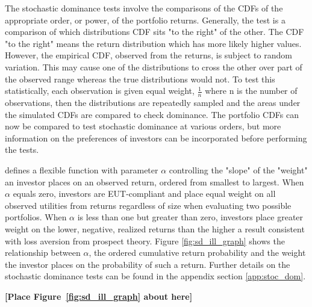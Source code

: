 %		
%	
%		
%	
%		
%	
%		
The stochastic dominance tests involve the comparisons of the CDFs of the appropriate order, or power, of the portfolio returns. Generally, the test is a comparison of which distributions CDF sits "to the right" of the other. The CDF "to the right" means the return distribution which has more likely higher values. However, the empirical CDF, observed from the returns, is subject to random variation. This may cause one of the distributions to cross the other over part of the observed range whereas the true distributions would not. To test this statistically, each observation is given equal weight, $\frac{1}{n}$ where n is the number of observations, then the distributions are repeatedly sampled and the areas under the simulated CDFs are compared to check dominance. The portfolio CDFs can now be compared to test stochastic dominance at various orders, but more information on the preferences of investors can be incorporated before performing the tests. 

\citet{prelec_probability_1998} defines a flexible function with parameter $\alpha$ controlling the "slope" of the "weight" an investor places on an observed return, ordered from smallest to largest. When $\alpha$ equals zero, investors are EUT-compliant and place equal weight on all observed utilities from returns regardless of size when evaluating two possible portfolios. When $\alpha$ is less than one but greater than zero, investors place greater weight on the lower, negative, realized returns than the higher a result consistent with loss aversion from prospect theory. Figure \ref{fig:sd_ill_graph} shows the relationship between $\alpha$, the ordered cumulative return probability and the weight the investor places on the probability of such a return. Further details on the stochastic dominance tests can be found in the appendix section \ref{app:stoc_dom}.
\bigskip
\centerline{\bf [Place Figure~\ref{fig:sd_ill_graph} about here]}
\bigskip


